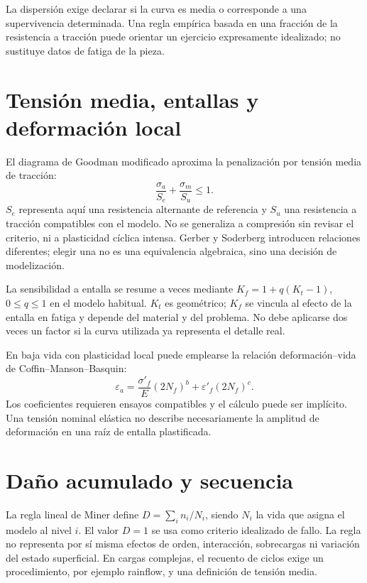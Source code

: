 La dispersión exige declarar si la curva es media o corresponde a una supervivencia determinada. Una regla empírica basada en una fracción de la resistencia a tracción puede orientar un ejercicio expresamente idealizado; no sustituye datos de fatiga de la pieza.
\section{Tensión media, entallas y deformación local}
El diagrama de Goodman modificado aproxima la penalización por tensión media de tracción:
\begin{equation}\frac{\sigma_a}{S_e}+\frac{\sigma_m}{S_u}\leq1.\label{eq:goodman}\end{equation}
$S_e$ representa aquí una resistencia alternante de referencia y $S_u$ una resistencia a tracción compatibles con el modelo. No se generaliza a compresión sin revisar el criterio, ni a plasticidad cíclica intensa. Gerber y Soderberg introducen relaciones diferentes; elegir una no es una equivalencia algebraica, sino una decisión de modelización.

La sensibilidad a entalla se resume a veces mediante $K_f=1+q(K_t-1)$, $0\leq q\leq1$ en el modelo habitual. $K_t$ es geométrico; $K_f$ se vincula al efecto de la entalla en fatiga y depende del material y del problema. No debe aplicarse dos veces un factor si la curva utilizada ya representa el detalle real.

En baja vida con plasticidad local puede emplearse la relación deformación--vida de Coffin--Manson--Basquin:
\begin{equation}\varepsilon_a=\frac{\sigma'_f}{E}(2N_f)^b+\varepsilon'_f(2N_f)^c.\label{eq:coffin}\end{equation}
Los coeficientes requieren ensayos compatibles y el cálculo puede ser implícito. Una tensión nominal elástica no describe necesariamente la amplitud de deformación en una raíz de entalla plastificada.
\section{Daño acumulado y secuencia}
La regla lineal de Miner define $D=\sum_i n_i/N_i$, siendo $N_i$ la vida que asigna el modelo al nivel $i$. El valor $D=1$ se usa como criterio idealizado de fallo. La regla no representa por sí misma efectos de orden, interacción, sobrecargas ni variación del estado superficial. En cargas complejas, el recuento de ciclos exige un procedimiento, por ejemplo rainflow, y una definición de tensión media.
